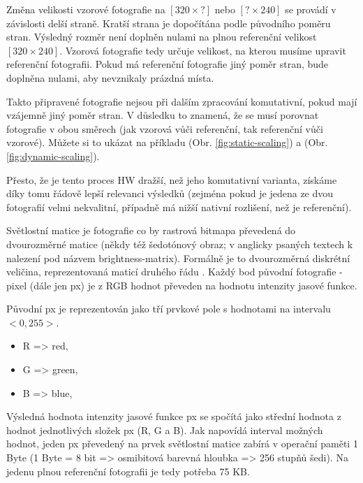 Změna velikosti vzorové fotografie na $ [320 × ?] $ nebo $ [? × 240] $ se provádí v závislosti delší straně. Kratší strana je dopočítána podle původního poměru stran. Výsledný rozměr není doplněn nulami na plnou referenční velikost $ [320 × 240] $. Vzorová fotografie tedy určuje velikost, na kterou musíme upravit referenční fotografii. Pokud má referenční fotografie jiný poměr stran, bude doplněna nulami, aby nevznikaly prázdná místa.

Takto připravené fotografie nejsou při dalším zpracování komutativní, pokud mají vzájemně jiný poměr stran. V důsledku to znamená, že se musí porovnat fotografie v obou směrech (jak vzorová vůči referenční, tak referenční vůči vzorové). Můžete si to ukázat na příkladu (Obr. \ref{fig:static-scaling}) a (Obr. \ref{fig:dynamic-scaling}).



Přesto, že je tento proces HW dražší, než jeho komutativní varianta, získáme díky tomu řádově lepší relevanci výsledků (zejména pokud je jedena ze dvou fotografií velmi nekvalitní, případně má nižší nativní rozlišení, než je referenční).

Světlostní matice je fotografie co by rastrová bitmapa převedená do dvourozměrné matice (někdy též šedotónový obraz; v anglicky psaných textech k nalezení pod názvem brightness-matrix). Formálně je to dvourozměrná diskrétní veličina, reprezentovaná maticí druhého řádu \cite{brightness-matrix}. Každý bod původní fotografie - pixel \cite{pixel} (dále jen px) je z RGB \cite{rgb} hodnot převeden na hodnotu intenzity jasové funkce.

Původní px je reprezentován jako tří prvkové pole s hodnotami na intervalu $ <0,255> $.
\begin{itemize}
	\setlength{\parskip}{0pt}
	\setlength{\itemsep}{0pt}
	\item R => red,
	\item G => green,
	\item B => blue,
\end{itemize}

Výsledná hodnota intenzity jasové funkce px se spočítá jako střední hodnota z hodnot jednotlivých složek px (R, G a B). Jak napovídá interval možných hodnot, jeden px převedený na prvek světlostní matice zabírá v operační paměti 1 Byte (1 Byte = 8 bit => osmibitová barevná hloubka => 256 stupňů šedi). Na jedenu plnou referenční fotografii je tedy potřeba 75 KB.

